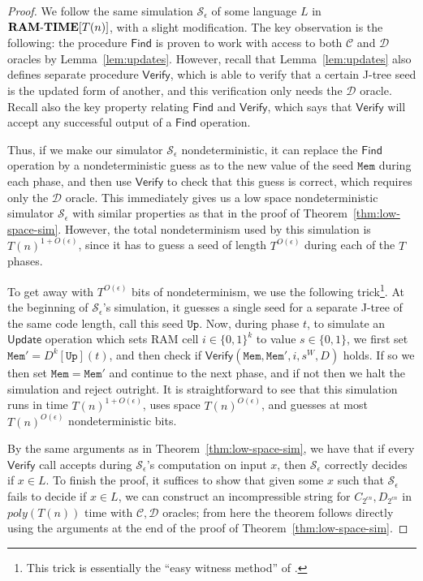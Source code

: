 \documentclass[11pt]{article}
\newcommand{\dash}{\text{-}}
\newcommand{\B}{\{0,1\}}
\def\cl{\bf}
\begin{document}
\begin{proof}
We follow the same simulation $\mathcal{S}_{\epsilon}$ of some language $L$ in ${\cl RAM\dash TIME}[T(n)]$, with a slight modification. The key observation is the following: the procedure $\mathsf{Find}$ is proven to work with access to both $\mathcal{C}$ and $\mathcal{D}$ oracles by Lemma~\ref{lem:updates}. However, recall that Lemma~\ref{lem:updates} also defines separate procedure $\mathsf{Verify}$, which is able to verify that a certain J-tree seed is the updated form of another, and this verification only needs the $\mathcal{D}$ oracle. Recall also the key property relating $\mathsf{Find}$ and $\mathsf{Verify}$, which says that $\mathsf{Verify}$ will accept any successful output of a $\mathsf{Find}$ operation.

Thus, if we make our simulator $\mathcal{S}_{\epsilon}$ nondeterministic, it can replace the $\mathsf{Find}$ operation by a nondeterministic guess as to the new value of the seed $\mathtt{Mem}$ during each phase, and then use $\mathsf{Verify}$ to check that this guess is correct, which requires only the $\mathcal{D}$ oracle. This immediately gives us a low space nondeterministic simulator $\mathcal{S}_{\epsilon}$ with similar properties as that in the proof of Theorem~\ref{thm:low-space-sim}. However, the total nondeterminism used by this simulation is $T(n)^{1 + O(\epsilon)}$, since it has to guess a seed of length $T^{O(\epsilon)}$ during each of the $T$ phases. 

To get away with $T^{O(\epsilon)}$ bits of nondeterminism, we use the following trick\footnote{This trick is essentially the ``easy witness method'' of \cite{Kabenets}.}. At the beginning of $\mathcal{S}_{\epsilon}$'s simulation, it guesses a single seed for a separate J-tree of the same code length, call this seed $\mathtt{Up}$. Now, during phase $t$, to simulate an $\mathsf{Update}$ operation which sets RAM cell $i \in \B^k$ to value $s \in \B$, we first set $\mathtt{Mem}' = D^k[\mathtt{Up}](t)$, and then check if $\mathsf{Verify}(\mathtt{Mem}, \mathtt{Mem}', i, s^W, D)$ holds. If so we then set $\mathtt{Mem} = \mathtt{Mem}'$ and continue to the next phase, and if not then we halt the simulation and reject outright. It is straightforward to see that this simulation runs in time $T(n)^{1 + O(\epsilon)}$, uses space $T(n)^{O(\epsilon)}$, and guesses at most $T(n)^{O(\epsilon)}$ nondeterministic bits.

By the same arguments as in Theorem~\ref{thm:low-space-sim}, we have that if every $\mathsf{Verify}$ call accepts during $\mathcal{S}_{\epsilon}$'s computation on input $x$, then $\mathcal{S}_{\epsilon}$ correctly decides if $x \in L$. To finish the proof, it suffices to show that given some $x$ such that $\mathcal{S}_{\epsilon}$ fails to decide if $x \in L$, we can construct an incompressible string for $C_{2^{\epsilon n}}, D_{2^{\epsilon n}}$ in $poly(T(n))$ time with $\mathcal{C}, \mathcal{D}$ oracles; from here the theorem follows directly using the arguments at the end of the proof of Theorem~\ref{thm:low-space-sim}. 


\end{proof}
\end{document}
